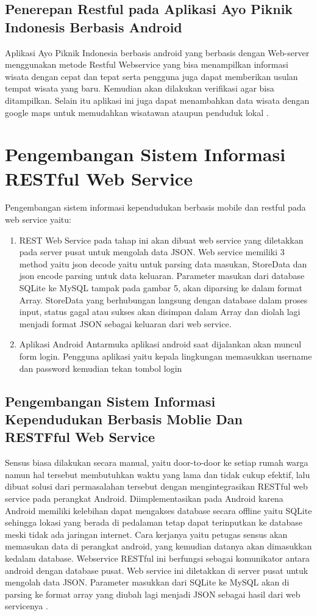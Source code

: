 \subsection{Penerepan Restful pada Aplikasi Ayo Piknik Indonesis Berbasis Android}
Aplikasi Ayo Piknik Indonesia berbasis android yang berbasis dengan Web-server menggunakan metode Restful Webservice yang bisa menampilkan informasi wisata dengan cepat dan tepat serta pengguna juga dapat memberikan usulan tempat wisata yang baru. Kemudian akan dilakukan verifikasi agar bisa ditampilkan. Selain itu aplikasi ini juga  dapat menambahkan data wisata dengan google maps untuk memudahkan wisatawan ataupun penduduk lokal \cite{aji2016penerapan}.

\section{Pengembangan Sistem Informasi RESTful Web Service}
Pengembangan sistem informasi kependudukan berbasis mobile dan restful pada web service yaitu\cite{kurniawati2016pengembangan}:
\begin{enumerate}
\item REST Web Service pada tahap ini akan dibuat web service yang diletakkan pada server pusat untuk mengolah data JSON. Web service memiliki 3 method yaitu json decode yaitu untuk parsing data masukan, StoreData dan json encode parsing untuk data keluaran. Parameter masukan dari database SQLite ke MySQL tampak pada gambar 5, akan diparsing ke dalam format Array. StoreData yang berhubungan langsung dengan database dalam proses input, status gagal atau sukses akan disimpan dalam Array dan diolah lagi menjadi format JSON sebagai keluaran dari web service.
\item Aplikasi Android Antarmuka aplikasi android saat dijalankan akan muncul form login. Pengguna aplikasi yaitu kepala lingkungan memasukkan username dan password kemudian tekan tombol login
\end{enumerate}

\subsection{Pengembangan Sistem Informasi Kependudukan Berbasis Moblie Dan RESTFful Web Service}
Sensus biasa dilakukan secara manual, yaitu door-to-door ke setiap rumah warga namun hal tersebut membutuhkan waktu yang lama dan tidak cukup efektif, lalu dibuat solusi dari permasalahan tersebut dengan mengintegrasikan RESTful web service pada perangkat Android. Diimplementasikan pada Android karena Android memiliki kelebihan dapat mengakses database secara offline yaitu SQLite sehingga lokasi yang berada di pedalaman tetap dapat terinputkan ke database meski tidak ada jaringan internet.
Cara kerjanya yaitu petugas sensus akan memasukan data di perangkat android, yang kemudian datanya akan dimasukkan kedalam database. Webservice RESTful ini berfungsi sebagai komunikator antara android dengan database pusat. Web service ini diletakkan di server pusat untuk mengolah data JSON. Parameter masukkan dari SQLite ke MySQL akan di parsing ke format array yang diubah lagi menjadi JSON sebagai hasil dari web servicenya \cite{kurniawati2016pengembangan}.

